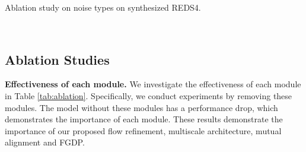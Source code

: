 \documentclass[10pt,twocolumn,letterpaper]{article}
\newlength \g
\begin{document}
\begin{table*}[h!]
    \begin{minipage}{.46\linewidth}
    \centering
    \caption{Ablation study on noise types on synthesized REDS4.}
    \label{tab:ablation_type}
  \end{minipage}
  ~
  \begin{minipage}{.53\linewidth}
    \centering
    \caption{Comparisons of PSNR with different learning paradigms.}
    \label{tab:paradigm}
  \end{minipage}
  \vspace{-3mm}
\end{table*}


\vspace{-1mm}
\subsection{Ablation Studies}
\vspace{-1mm}
\noindent\textbf{Effectiveness of each module.}
We investigate the effectiveness of each module in Table \ref{tab:ablation}.
Specifically, we conduct experiments by removing these modules.
The model without these modules has a performance drop, which demonstrates the importance of each module.
These results demonstrate the importance of our proposed flow refinement, multiscale architecture, mutual alignment and FGDP.
\end{document}
